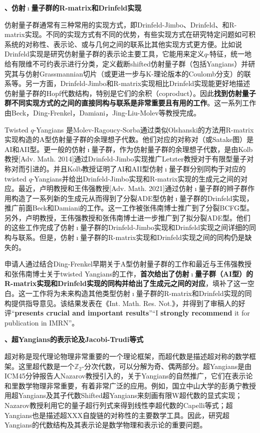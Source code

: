 \documentclass[12pt,UTF8,AutoFakeBold=4,a4paper]{ctexart}
\begin{document}
\medskip

\textbf{、仿射$\imath$量子群的R-matrix和Drinfeld实现}

仿射量子群通常有三种常用的实现方式，即Drinfeld-Jimbo、Drinfeld、和R-matrix实现。不同的实现方式有不同的优势，有些实现方式在研究特定问题如可积系统的对称性、表示论、或与几何之间的联系比其他实现方式更方便。比如说Drinfeld实现是研究仿射量子群的表示论主要工具，它能用来定义$q$-特征，统一地给有限维不可约表示进行分类，定义截断shifted仿射量子群（包括Yangians）并研究其与仿射Grassmannian切片（或更进一步与K-理论版本的Coulomb分支）的联系等。另一方面，Drinfeld-Jimbo和R-matrix实现相比Drinfeld实现能更好地描述仿射量子群的Hopf代数结构，特别是它们的余积（coproduct）。因此\textbf{找到仿射量子群不同实现方式的之间的直接同构与联系是非常重要且有用的工作}。这一系列工作由Beck，Ding-Frenkel，Damiani，Jing-Liu-Molev等教授完成。

Twisted $q$-Yangians 是Molev-Ragoucy-Sorba通过类似Olshanski的方法用R-matrix实现构造的A型仿射量子群的余理想子代数。他们对应的对称对（或Satake图）是AI和AII型。更一般的仿射$\imath$量子群，作为仿射量子群的余理想子代数，是由Kolb教授[Adv. Math. 2014]通过Drinfeld-Jimbo实现推广Letzter教授对于有限型量子对称对而引进的。并且Kolb教授证明了AI和AII型仿射$\imath$量子群分别同构于对应的twisted $q$-Yangians并给出Drinfeld-Jimbo实现和R-matrix实现的生成元之间的对应。最近，卢明教授和王伟强教授[Adv. Math. 2021]通过仿射$\imath$量子群的辫子群作用构造了一系列新的生成元从而得到了分裂ADE型仿射$\imath$量子群的Drinfeld实现，推广前面Beck和Damiani的工作。这一工作被张伟南博士推广到了分裂BCFG型。另外，卢明教授，王伟强教授和张伟南博士进一步推广到了拟分裂ADE型。他们的这些工作完成了仿射$\imath$量子群的Drinfeld-Jimbo实现和Drinfeld实现之间详细的同构与联系。但是，仿射$\imath$量子群的R-matrix实现和Drinfeld实现之间的同构仍是缺失的。

申请人通过结合Ding-Frenkel早期关于A型仿射量子群的工作和最近与王伟强教授和张伟南博士关于twisted Yangians的工作，\textbf{首次给出了仿射$\imath$量子群（AI型）的R-matrix实现和Drinfeld实现的同构并给出了生成元之间的对应}，填补了这一空白。这一工作将为未来构造其他类型仿射$\imath$量子群的R-matrix和Drinfeld实现的同构提供指导意见。该结果发表在《Int.
Math. Res. Not.》，并得到了审稿人的好评“\textbf{presents crucial and important results}”“I \textbf{strongly recommend} it for publication in IMRN”。

\medskip

\textbf{、超Yangians的表示论及Jacobi-Trudi等式}

超对称是现代理论物理非常重要的一个理论框架，而超代数是描述超对称的数学框架。这里超代数是一个$\mathbb Z_2$-分次代数，可以分解为奇、偶两部分。超Yangians是由ICM45分钟报告人Nazarov教授引入的，关于Yangians的自然推广，它们在表示论和里数学物理非常重要，有着非常广泛的应用。例如，国立中山大学的彭勇宁教授用超Yangians及其子代数Shifted超Yangians来刻画有限W超代数的显式实现；Nazarov教授利用它的量子超行列式来得到线性李超代数的Capelli等式；超Yangians也是描述超XXX自旋链的对称性的主要数学工具。因此，研究超Yangians的代数结构及其表示论是数学物理和表示论的重要问题。
\end{document}
